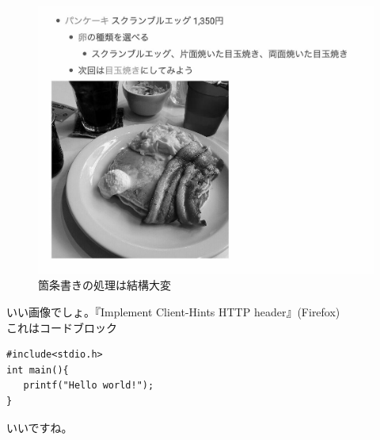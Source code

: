 \begin{figure}[h]
  \begin{center}
     \includegraphics[width=0.7\linewidth]{./cmyk-gray-gyazo-images/retina_pancake.jpg}
     \caption{箇条書きの処理は結構大変}
     \label{xslt-story}
  \end{center}
\end{figure}
いい画像でしょ。『Implement Client-Hints HTTP header』(Firefox)\\

これはコードブロック
\begin{lstlisting}[frame=tb,label=my-first-code,caption=my\_first\_code.c]
#include<stdio.h>
int main(){
   printf("Hello world!");
}
\end{lstlisting}

いいですね。\\


